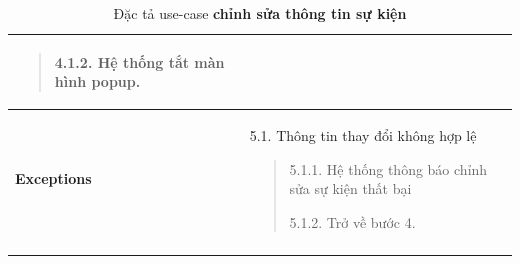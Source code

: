 {\begin{longtable}{| p{} | p{} |}
\begin{quote}
            4.1.2. Hệ thống tắt màn hình popup.
        \end{quote}
        \\
        \hline
        \begin{flushleft}
            \textbf{Exceptions}
        \end{flushleft}
         &
        5.1. Thông tin thay đổi không hợp lệ
        \begin{quote}
            5.1.1. Hệ thống thông báo chỉnh sửa sự kiện thất bại

            5.1.2. Trở về bước 4.
        \end{quote}
        \\
        \hline
        \caption{Đặc tả use-case \textbf{chỉnh sửa thông tin sự kiện}}
    \end{longtable}
}
